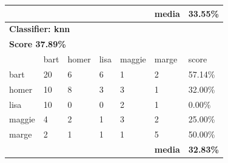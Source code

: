 \documentclass[paper=a4, fontsize=11pt]{scrartcl} %
\numberwithin{equation}{section} %
\numberwithin{figure}{section} %
\numberwithin{table}{section} %
\begin{document}
\begin{table}[!htb]
\begin{tabular}{l|l|l|l|l|l|l}
\textbf{} & \textbf{} & \textbf{} & \textbf{} & \textbf{} & \textbf{media} & \textbf{33.55\%} \\ \hline
\multicolumn{7}{l}{\textbf{Classifier: knn}}                                                \\ \hline
\multicolumn{7}{l}{\textbf{Score 37.89\%}}                                                  \\ \hline
          & bart      & homer     & lisa      & maggie    & marge          & score            \\ \hline
bart      & 20        & 6         & 6         & 1         & 2              & 57.14\%          \\ \hline
homer     & 10        & 8         & 3         & 3         & 1              & 32.00\%          \\ \hline
lisa      & 10        & 0         & 0         & 2         & 1              & 0.00\%           \\ \hline
maggie    & 4         & 2         & 1         & 3         & 2              & 25.00\%          \\ \hline
marge     & 2         & 1         & 1         & 1         & 5              & 50.00\%          \\ \hline
\textbf{} & \textbf{} & \textbf{} & \textbf{} & \textbf{} & \textbf{media} & \textbf{32.83\%} \\ \hline
\end{tabular}
\end{table}
\end{document}
